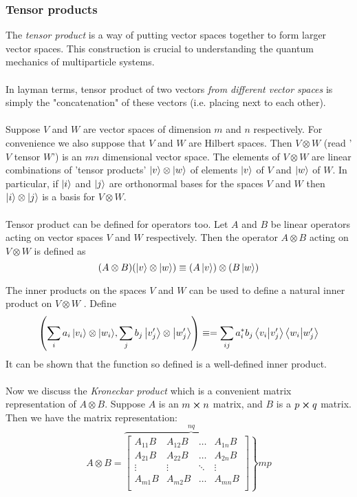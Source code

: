 \subsubsection{Tensor products}
The \textit{tensor product} is a way of putting vector spaces together to form larger vector spaces. This construction is crucial to understanding the quantum mechanics of multiparticle systems.
\\\\
In layman terms, tensor product of two vectors \textit{from different vector spaces} is simply the "concatenation" of these vectors (i.e. placing next to each other).
\\\\
Suppose $V$ and $W$ are vector spaces of dimension $m$ and $n$ respectively. For convenience we also suppose that $V$ and $W$ are Hilbert spaces. Then $V \otimes W$ (read '$V$ tensor $W$') is an $mn$ dimensional vector space. The elements of $V \otimes W$ are linear combinations of 'tensor products' $\ket{v}\otimes\ket{w}$ of elements $\ket{v}$ of $V$ and $\ket{w}$ of $W$. In particular, if $\ket{i}$ and $\ket{j}$ are orthonormal bases for the spaces $V$ and $W$ then $\ket{i}\otimes\ket{j}$ is a basis for $V \otimes W$.
\\\\
Tensor product can be defined for operators too. Let $A$ and $B$ be linear operators acting on vector spaces $V$ and $W$ respectively. Then the operator $A \otimes B$ acting on $V \otimes W$ is defined as
    $$(A \otimes B)(\ket{v}\otimes\ket{w}) \equiv (A\ket{v})\otimes(B\ket{w})$$

The inner products on the spaces $V$ and $W$ can be used to define a natural inner product on $V \otimes W$ . Define
    $$\left(\sum_{i}{a_i\ket{v_i}\otimes\ket{w_i}}, \sum_{j}{b_j\ket{v_j'}\otimes\ket{w_j'}}\right) \equiv = \sum_{ij}{a_i^\ast b_j\braket{v_i}{v_j'}\braket{w_i}{w_j'}}$$
It can be shown that the function so defined is a well-defined inner product.
\\\\
Now we discuss the \textit{Kroneckar product} which is a convenient matrix representation of $A \otimes B$. Suppose $A$ is an $m \cross n$ matrix, and $B$ is a $p \cross q$ matrix. Then we have the matrix representation:
    $$A \otimes B = \overbrace{\left.\begin{bmatrix}
                                A_{11}B & A_{12}B & \dots & A_{1n}B \\
                                A_{21}B & A_{22}B & \dots & A_{2n}B \\
                                \vdots & \vdots & \ddots & \vdots \\
                                A_{m1}B & A_{m2}B & \dots & A_{mn}B \\
                                \end{bmatrix}\right\}}^{nq}mp$$

